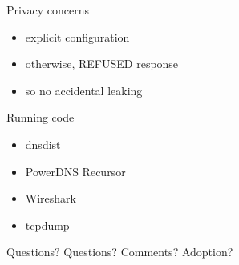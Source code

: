 \documentclass{beamer}
\begin{document}
\begin{frame}{Privacy concerns}
  \begin{itemize}
    \item explicit configuration
    \item otherwise, REFUSED response
    \item so no accidental leaking
  \end{itemize}
\end{frame}

\begin{frame}{Running code}
  \begin{itemize}
    \item dnsdist 
    \item PowerDNS Recursor
    \item Wireshark
    \item tcpdump
  \end{itemize}
\end{frame}

\begin{frame}{Questions?}
Questions? Comments? Adoption?

\end{frame}
\end{document}
